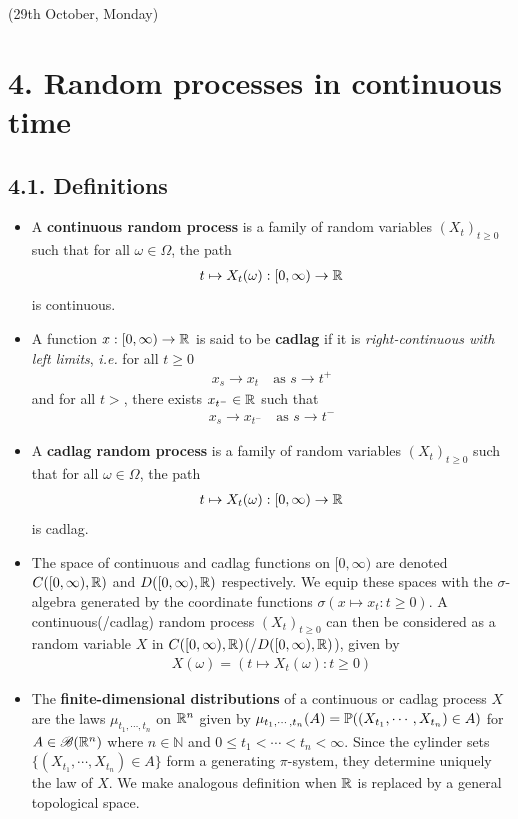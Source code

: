 \documentclass[12pt,a4paper]{report}
\begin{document}
\newday

(29th October, Monday)

\section*{4. Random processes in continuous time}

\subsection*{4.1. Definitions}

\begin{itemize}
\item A \textbf{continuous random process} is a family of random variables $(X_t)_{t\geq 0}$ such that for all $\omega \in \Omega$, the path
\begin{align*}
t \mapsto X_t(\omega) : [0, \infty ) \rightarrow \mathbb{R}
\end{align*}
is continuous.
\item A function $x:[0, \infty) \rightarrow \mathbb{R}$ is said to be \textbf{cadlag} if it is \emph{right-continuous with left limits}, \emph{i.e.} for all $t\geq 0$
\begin{align*}
x_s \rightarrow x_t \quad \text{as } s\rightarrow t^+
\end{align*}
and for all $t>$, there exists $x_{t^-} \in \mathbb{R}$ such that
\begin{align*}
x_s \rightarrow x_{t^-} \quad \text{as } s\rightarrow t^-
\end{align*}
\item A \textbf{cadlag random process} is a family of random variables $(X_t)_{t\geq 0}$ such that for all $\omega \in \Omega$, the path
\begin{align*}
t \mapsto X_t(\omega) : [0, \infty ) \rightarrow \mathbb{R}
\end{align*}
is cadlag.
\item The space of continuous and cadlag functions on $[0,\infty)$ are denoted $C([0,\infty),\mathbb{R})$ and $D([0,\infty), \mathbb{R})$ respectively. We equip these spaces with the $\sigma$-algebra generated by the coordinate functions $\sigma (x\mapsto x_t : t\geq 0)$. A continuous(/cadlag) random process $(X_t)_{t\geq 0}$ can then be considered as a random variable $X$ in $C([0,\infty), \mathbb{R})$(/$D([0,\infty), \mathbb{R})$), given by
\begin{align*}
X(\omega) = (t\mapsto X_t(\omega) : t\geq 0)
\end{align*}
\item The \textbf{finite-dimensional distributions} of a continuous or cadlag process $X$ are the laws $\mu_{t_1, \cdots ,t_n}$ on $\mathbb{R}^n$ given by $\mu_{t_1,\cdots, t_n}(A) = \mathbb{P}((X_{t_1},\cdots, X_{t_n}) \in A)$ for $A \in \mathscr{B}(\mathbb{R}^n)$ where $n \in \mathbb{N}$ and $0\leq t_1 <\cdots < t_n < \infty$. Since the cylinder sets $\{(X_{t_1}, \cdots, X_{t_n}) \in A\}$ form a generating $\pi$-system, they determine uniquely the law of $X$. We make analogous definition when $\mathbb{R}$ is replaced by a general topological space.
\end{itemize}
\end{document}
